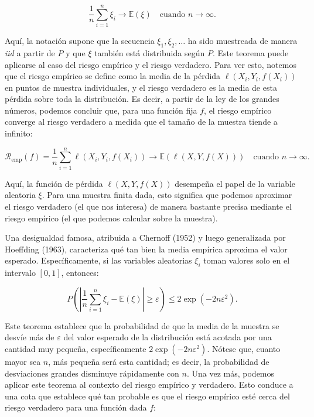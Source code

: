 \documentclass{report}
\begin{document}
\[
\frac{1}{n} \sum_{i=1}^n \xi_i \to \mathbb{E}(\xi) \quad \text{cuando } n \to \infty.
\]

Aquí, la notación supone que la secuencia \(\xi_1, \xi_2, \dots\) ha sido muestreada de manera \textit{iid} 
a partir de \(P\) y que \(\xi\) también está distribuida según \(P\). Este teorema puede aplicarse al caso del 
riesgo empírico y el riesgo verdadero. Para ver esto, notemos que el riesgo empírico se define como la media de 
la pérdida \(\ell(X_i, Y_i, f(X_i))\) en puntos de muestra individuales, y el riesgo verdadero es la media de 
esta pérdida sobre toda la distribución. Es decir, a partir de la ley de los grandes números, podemos concluir 
que, para una función fija \(f\), el riesgo empírico converge al riesgo verdadero a medida que el tamaño de la 
muestra tiende a infinito:

\[
\mathcal{R}_{\text{emp}}(f) = \frac{1}{n} \sum_{i=1}^n \ell(X_i, Y_i, f(X_i)) \to \mathbb{E}(\ell(X, Y, f(X))) \quad 
\text{cuando } n \to \infty.
\]

Aquí, la función de pérdida \(\ell(X, Y, f(X))\) desempeña el papel de la variable aleatoria \(\xi\). Para una 
muestra finita dada, esto significa que podemos aproximar el riesgo verdadero (el que nos interesa) de manera 
bastante precisa mediante el riesgo empírico (el que podemos calcular sobre la muestra).\newline

Una desigualdad famosa, atribuida a Chernoff (1952) y luego generalizada por Hoeffding (1963), caracteriza qué 
tan bien la media empírica aproxima el valor esperado. Específicamente, si las variables aleatorias \(\xi_i\) 
toman valores solo en el intervalo \([0, 1]\), entonces:

\begin{equation}\label{eq:Chernoff-Hoeffding}
P\left( \left| \frac{1}{n} \sum_{i=1}^n \xi_i - \mathbb{E}(\xi) \right| \geq \varepsilon \right) \leq 
2 \exp(-2n\varepsilon^2). 
\end{equation}\newline

Este teorema establece que la probabilidad de que la media de la muestra se desvíe más de \(\varepsilon\) del 
valor esperado de la distribución está acotada por una cantidad muy pequeña, específicamente \(2 \exp(-2n\varepsilon^2)\). 
Nótese que, cuanto mayor sea \(n\), más pequeña será esta cantidad; es decir, la probabilidad de desviaciones 
grandes disminuye rápidamente con \(n\). Una vez más, podemos aplicar este teorema al contexto del riesgo empírico 
y verdadero. Esto conduce a una cota que establece qué tan probable es que el riesgo empírico esté cerca del 
riesgo verdadero para una función dada \(f\):
\end{document}
